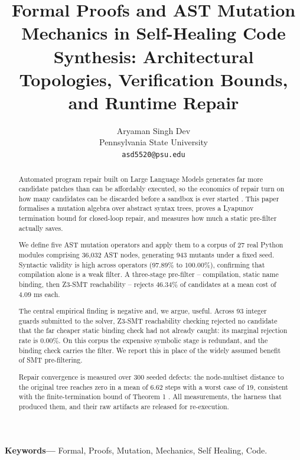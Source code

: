 \documentclass[10pt,twocolumn,letterpaper]{article}
\begin{document}
\title{Formal Proofs and AST Mutation Mechanics in Self-Healing Code Synthesis: Architectural Topologies, Verification Bounds, and Runtime Repair}

\author{
Aryaman Singh Dev\\
Pennsylvania State University \\
\texttt{asd5520@psu.edu}
}

\maketitle

\begin{abstract}
Automated program repair built on Large Language Models generates far more candidate patches than can be affordably executed, so the economics of repair turn on how many candidates can be discarded before a sandbox is ever started \cite{arxiv_2405_01543,arxiv_2010_11146}. This paper formalises a mutation algebra over abstract syntax trees, proves a Lyapunov termination bound for closed-loop repair, and measures how much a static pre-filter actually saves.

We define five AST mutation operators and apply them to a corpus of 27 real Python modules comprising 36{,}032 AST nodes, generating 943 mutants under a fixed seed. Syntactic validity is high across operators ($97.89\%$ to $100.00\%$), confirming that compilation alone is a weak filter. A three-stage pre-filter -- compilation, static name binding, then Z3-SMT reachability -- rejects $46.34\%$ of candidates at a mean cost of $4.09$ ms each.

The central empirical finding is negative and, we argue, useful. Across 93 integer guards submitted to the solver, Z3-SMT reachability checking rejected no candidate that the far cheaper static binding check had not already caught: its marginal rejection rate is $0.00\%$. On this corpus the expensive symbolic stage is redundant, and the binding check carries the filter. We report this in place of the widely assumed benefit of SMT pre-filtering.

Repair convergence is measured over 300 seeded defects: the node-multiset distance to the original tree reaches zero in a mean of $6.62$ steps with a worst case of $19$, consistent with the finite-termination bound of Theorem 1 \cite{arxiv_2501_02497}. All measurements, the harness that produced them, and their raw artifacts are released for re-execution.
\end{abstract}

\noindent\textbf{Keywords---} Formal, Proofs, Mutation, Mechanics, Self Healing, Code.
\end{document}
